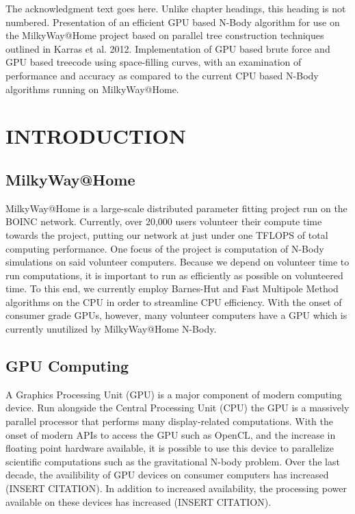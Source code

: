 \documentclass{thesis}
\author{Clayton Rayment}
\begin{document}
 
\titlepage             %
\tableofcontents       %
\listoftables          %
\listoffigures         %

The acknowledgment text goes here. Unlike chapter headings, 
this heading is not numbered.
Presentation of an efficient GPU based N-Body algorithm for use on the MilkyWay@Home project based on parallel tree construction techniques outlined in Karras et al. 2012. Implementation of GPU based brute force and GPU based treecode using space-filling curves, with an examination of performance and accuracy as compared to the current CPU based N-Body algorithms running on MilkyWay@Home.
\chapter{INTRODUCTION}
\section{MilkyWay@Home}
MilkyWay@Home is a large-scale distributed parameter fitting project run on the BOINC network. Currently, over 20,000 users volunteer their compute time towards the project, putting our network at just under one TFLOPS of total computing performance.  One focus of the project is computation of N-Body simulations on said volunteer computers. Because we depend on volunteer time to run computations, it is important to run as efficiently as possible on volunteered time. To this end, we currently employ Barnes-Hut and Fast Multipole Method algorithms on the CPU in order to streamline CPU efficiency. With the onset of consumer grade GPUs, however, many volunteer computers have a GPU which is currently unutilized by MilkyWay@Home N-Body.
\section{GPU Computing}
A Graphics Processing Unit (GPU) is a major component of modern computing device. Run alongside the Central Processing Unit (CPU) the GPU is a massively parallel processor that performs many display-related computations. With the onset of modern APIs to access the GPU such as OpenCL, and the increase in floating point hardware available, it is possible to use this device to parallelize scientific computations such as the gravitational N-body problem. Over the last decade, the availibility of GPU devices on consumer computers has increased (INSERT CITATION). In addition to increased availability, the processing power available on these devices has increased (INSERT CITATION).
\end{document}
